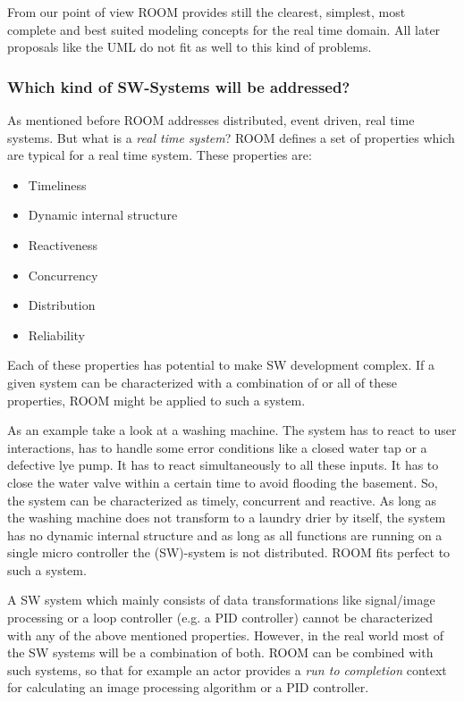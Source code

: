 From our point of view ROOM provides still the clearest, simplest, most complete and best suited modeling
concepts for the real time domain. All later proposals like the UML do not fit as well to this kind of problems.
 

\subsubsection{Which kind of SW-Systems will be addressed?}

As mentioned before ROOM addresses distributed, event driven, real time systems.
But what is a \emph{real time system}? ROOM defines a set of properties
which are typical for a real time system. These properties are:

\begin{itemize}
\item Timeliness
\item Dynamic internal structure
\item Reactiveness
\item Concurrency
\item Distribution
\item Reliability
\end{itemize}

Each of these properties has potential to make SW development complex. If a given system can be characterized
with a combination of or all of these properties, ROOM might be applied to such a system.  

As an example take a look at a washing machine. The system has to react to user interactions, has to handle
some error conditions like a closed water tap or a defective lye pump. It has to react simultaneously to all these inputs.
It has to close the water valve within a certain time to avoid flooding the basement. 
So, the system can be characterized as timely, concurrent and reactive. As long as the washing machine does
not transform to a laundry drier by itself, the system has no dynamic internal structure and as long as all functions
are running on a single micro controller the (SW)-system is not distributed. 
ROOM fits perfect to such a system.

A SW system which mainly consists of data transformations like signal/image processing or a loop controller
(e.g. a PID controller) cannot be characterized with any of the above mentioned properties. However, in the real
world most of the SW systems will be a combination of both. ROOM can be combined with such systems, so that for
example an actor provides a \emph{run to completion} context for calculating an image processing algorithm or a
PID controller.  

